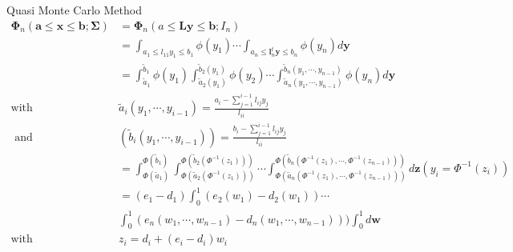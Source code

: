 \begin{frame}{Quasi Monte Carlo Method}
\footnotesize
\begin{align}
\boldsymbol{\Phi}_n(\mathbf{a}\leq\mathbf{x}\leq\mathbf{b};\boldsymbol{\Sigma})
&=\boldsymbol{\Phi}_n(a\leq\mathbf{Ly}\leq\mathbf{b};I_n)\nonumber\\
&=\int_{a_1\leq l_{11}y_1\leq b_1}\phi(y_1)\cdots\int_{a_n\leq\mathbf{l}_n^t\mathbf{y}\leq b_n}\phi(y_n)d\mathbf{y}\nonumber\\
&=\int_{\tilde{a}_1}^{\tilde{b}_1}\phi(y_1)
\int_{\tilde{a}_2(y_1)}^{\tilde{b}_2(y_1)}\phi(y_2)\cdots
\int_{\tilde{a}_n(y_1,\cdots,y_{n-1})}^{\tilde{b}_n(y_1,\cdots,y_{n-1})}\phi(y_n)d\mathbf{y}\nonumber\\
\text{with } & \tilde{a}_i(y_1,\cdots,y_{i-1})=\frac{a_i-\sum_{j=1}^{i-1}l_{ij}y_j}{l_{ii}}\nonumber\\\text{ and }
&(\tilde{b}_i(y_1,\cdots,y_{i-1}))=\frac{b_i-\sum_{j=1}^{i-1}l_{ij}y_j}{l_{ii}}\nonumber\\
&=\int_{\Phi(\tilde{a}_1)}^{\Phi(\tilde{b}_1)}
\int_{\Phi(\tilde{a}_2(\Phi^{-1}(z_1)))}^{\Phi(\tilde{b}_2(\Phi^{-1}(z_1)))}\cdots
\int_{\Phi(\tilde{a}_n(\Phi^{-1}(z_1),\cdots,\Phi^{-1}(z_{n-1})))}^{\Phi(\tilde{b}_n(\Phi^{-1}(z_1),\cdots,\Phi^{-1}(z_{n-1})))}
d\mathbf{z}(y_i=\Phi^{-1}(z_i))\nonumber\nonumber\\
&=(e_1-d_1)\int_0^1(e_2(w_1)-d_2(w_1))\cdots\nonumber\\
&\int_0^1(e_n(w_1,\cdots,w_{n-1}) - d_n(w_1,\cdots,w_{n-1})))\int_0^1d\mathbf{w}\nonumber\\
\text{with } & z_i=d_i+(e_i-d_i)w_i 
\label{eqn:qmc}
\end{align}
\end{frame}

